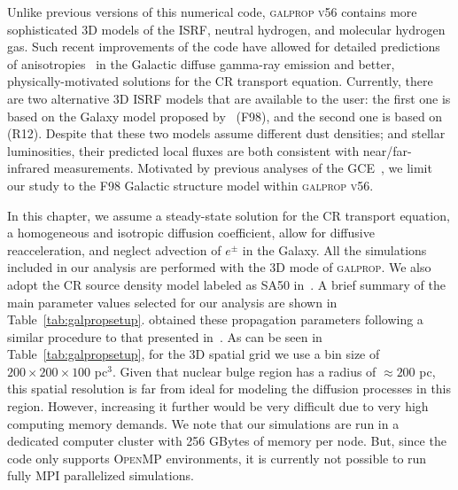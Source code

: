 \documentclass[doublespace,nopageskip]{VTthesis} %
\begin{document}
Unlike previous versions of this numerical code, \textsc{galprop v56}  contains more sophisticated 3D models of the ISRF, 
neutral hydrogen, and molecular hydrogen gas. Such recent improvements of the code have allowed for detailed predictions of anisotropies~\citep{2017ApJ...846...67P,2018ApJ...856...45J} in the Galactic diffuse gamma-ray emission and better, physically-motivated solutions for the CR transport equation.
%
Currently, there are two alternative 3D ISRF models that are available to the user: the first one is based on the Galaxy model proposed by~\cite{1998ApJ...492..495F} (F98), and the second one is based on~\cite{2012A&A...545A..39R} (R12). Despite that these two models assume different dust densities; and stellar luminosities, their predicted local fluxes are both consistent with near/far-infrared measurements. Motivated by previous analyses of the GCE~\citep{2018NatAs...2..387M,2018NatAs...2..819B,2019JCAP...09..042M}, we limit our study to the F98 Galactic structure model within \textsc{galprop v56}.

In this chapter, we assume a steady-state solution for the CR transport equation, a homogeneous and isotropic diffusion coefficient, allow for diffusive reacceleration,  and neglect advection of $e^\pm$ in the Galaxy. All the simulations included in our analysis are performed with the 3D mode of \textsc{galprop}. We also adopt the CR source density model labeled as SA50 in~\cite{2018ApJ...856...45J}.  A brief summary of the main parameter values selected for our analysis are shown in Table~\ref{tab:galpropsetup}. \cite{2018ApJ...856...45J} obtained these propagation parameters following a similar procedure to that presented in~\cite{2017ApJ...846...67P}. As can be seen in Table~\ref{tab:galpropsetup}, for the 3D spatial grid we use a bin size of $200\times200\times100$ pc$^3$. Given that nuclear bulge region has a radius of $\approx 200$ pc, this spatial resolution is far from ideal for modeling the diffusion processes in this region. However, increasing it further would be very difficult due to very high computing memory demands. We note that our simulations are run in a dedicated computer cluster with 256 GBytes of memory per node. But, since the code only supports \textsc{OpenMP} environments, it is currently not possible to run fully \textsc{MPI} parallelized simulations.  
\end{document}
